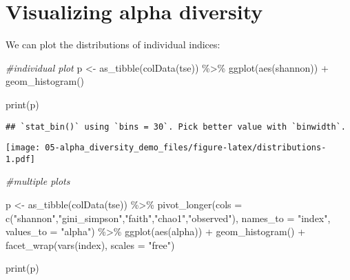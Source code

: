 \documentclass[
  oneside]{book}
\newenvironment{Shaded}{\begin{snugshade}}{\end{snugshade}}
\newcommand{\AttributeTok}[1]{\textcolor[rgb]{0.77,0.63,0.00}{#1}}
\newcommand{\CommentTok}[1]{\textcolor[rgb]{0.56,0.35,0.01}{\textit{#1}}}
\newcommand{\FunctionTok}[1]{\textcolor[rgb]{0.00,0.00,0.00}{#1}}
\newcommand{\NormalTok}[1]{#1}
\newcommand{\OtherTok}[1]{\textcolor[rgb]{0.56,0.35,0.01}{#1}}
\newcommand{\SpecialCharTok}[1]{\textcolor[rgb]{0.00,0.00,0.00}{#1}}
\newcommand{\StringTok}[1]{\textcolor[rgb]{0.31,0.60,0.02}{#1}}
\begin{document}
\hypertarget{visualizing-alpha-diversity}{%
\section{Visualizing alpha diversity}\label{visualizing-alpha-diversity}}

We can plot the distributions of individual indices:

\begin{Shaded}
\begin{Highlighting}[]
\CommentTok{\#individual plot}
\NormalTok{p }\OtherTok{\textless{}{-}} \FunctionTok{as\_tibble}\NormalTok{(}\FunctionTok{colData}\NormalTok{(tse)) }\SpecialCharTok{\%\textgreater{}\%} 
  \FunctionTok{ggplot}\NormalTok{(}\FunctionTok{aes}\NormalTok{(shannon)) }\SpecialCharTok{+}
  \FunctionTok{geom\_histogram}\NormalTok{() }

\FunctionTok{print}\NormalTok{(p)}
\end{Highlighting}
\end{Shaded}

\begin{verbatim}
## `stat_bin()` using `bins = 30`. Pick better value with `binwidth`.
\end{verbatim}

\texttt{[image: 05-alpha\_diversity\_demo\_files/figure-latex/distributions-1.pdf]}

\begin{Shaded}
\begin{Highlighting}[]
\CommentTok{\#multiple plots}

\NormalTok{p }\OtherTok{\textless{}{-}} \FunctionTok{as\_tibble}\NormalTok{(}\FunctionTok{colData}\NormalTok{(tse)) }\SpecialCharTok{\%\textgreater{}\%} 
  \FunctionTok{pivot\_longer}\NormalTok{(}\AttributeTok{cols =} \FunctionTok{c}\NormalTok{(}\StringTok{"shannon"}\NormalTok{,}\StringTok{"gini\_simpson"}\NormalTok{,}\StringTok{"faith"}\NormalTok{,}\StringTok{"chao1"}\NormalTok{,}\StringTok{"observed"}\NormalTok{), }\AttributeTok{names\_to =} \StringTok{"index"}\NormalTok{, }\AttributeTok{values\_to =} \StringTok{"alpha"}\NormalTok{) }\SpecialCharTok{\%\textgreater{}\%} 
  \FunctionTok{ggplot}\NormalTok{(}\FunctionTok{aes}\NormalTok{(alpha)) }\SpecialCharTok{+}
  \FunctionTok{geom\_histogram}\NormalTok{() }\SpecialCharTok{+}
  \FunctionTok{facet\_wrap}\NormalTok{(}\FunctionTok{vars}\NormalTok{(index), }\AttributeTok{scales =} \StringTok{"free"}\NormalTok{)}


\FunctionTok{print}\NormalTok{(p)}
\end{Highlighting}
\end{Shaded}
\end{document}
